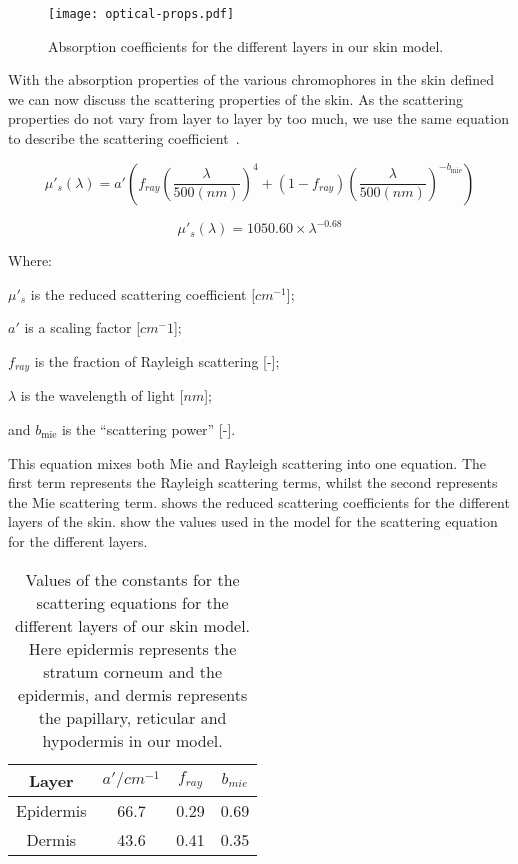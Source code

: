 \begin{figure}[!htpb]
  \centering
  \texttt{[image: optical-props.pdf]}
  \caption{Absorption coefficients for the different layers in our skin model.}
  \label{fig:absoplayers}
\end{figure}


With the absorption properties of the various chromophores in the skin defined we can now discuss the scattering properties of the skin.
As the scattering properties do not vary from layer to layer by too much, we use the same equation to describe the scattering coefficient~\cite{jacques2013optical,iglesias2015biophysically,louisethesis}.

\begin{equation}
\mu'_s(\lambda)=a'\left(f_{ray}\left(\frac{\lambda}{500(nm)}\right)^4+(1-f_{ray})\left(\frac{\lambda}{500(nm)}\right)^{-b_{\text{mie}}}\right)
\label{eqn:scattrest}
\end{equation}

\begin{equation}
\mu'_s(\lambda)=1050.60\times\lambda^{-0.68}
\label{eqn:hyposcat}
\end{equation}


\noindent Where:

	$\mu'_s$ is the reduced scattering coefficient [$cm^{-1}$];

	$a'$ is a scaling factor [$cm^-1$];

	$f_{ray}$ is the fraction of Rayleigh scattering [-];

	$\lambda$ is the wavelength of light [$nm$];

	and $b_{\text{mie}}$ is the ``scattering power'' [-].

\medskip

This equation mixes both Mie and Rayleigh scattering into one equation.
The first term represents the Rayleigh scattering terms, whilst the second represents the Mie scattering term.
 shows the reduced scattering coefficients for the different layers of the skin.
 show the values used in the model for the scattering equation for the different layers.

\begin{table}[!htpb]
  \centering

  \begin{tabular}{|c|c|c|c|}
  \hline

  Layer & $a'/cm^{-1}$ & $f_{ray}$ & $b_{mie}$ \\
  \hline
   Epidermis         & 66.7 & 0.29 & 0.69 \\
   Dermis  & 43.6 & 0.41 & 0.35 \\

  \hline
  \end{tabular}
  \caption{Values of the constants for the scattering equations for the different layers of our skin model. Here epidermis represents the stratum corneum and the epidermis, and dermis represents the papillary, reticular and hypodermis in our model.}
  \label{tab:valscat}

\end{table}

